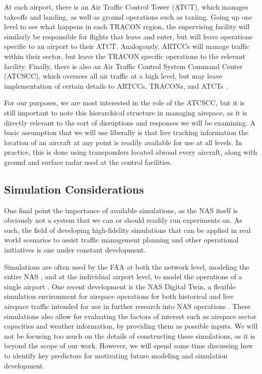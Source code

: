 At each airport, there is an Air Traffic Control Tower (ATCT), which manages takeoffs and landing, as well as ground operations such as taxiing. Going up one level to see what happens in each TRACON region, the supervising facility will similarly be responsible for flights that leave and enter, but will leave operations specific to an airport to their ATCT. Analogously, ARTCCs will manage traffic within their sector, but leave the TRACON specific operations to the relevant facility. Finally, there is also an Air Traffic Control System Command Center (ATCSCC), which oversees all air traffic at a high level, but may leave implementation of certain details to ARTCCs, TRACONs, and ATCTs \cite{faa_tfm_overview_2025}.

For our purposes, we are most interested in the role of the ATCSCC, but it is still important to note this hierarchical structure in managing airspace, as it is directly relevant to the sort of disruptions and responses we will be examining. A basic assumption that we will use liberally is that live tracking information the location of an aircraft at any point is readily available for use at all levels. In practice, this is done using transponders located abroad every aircraft, along with ground and surface radar used at the control facilities. \cite{faa_tfm_prez_2009}


\subsection{Simulation Considerations}

One final point the importance of available simulations, as the NAS itself is obviously not a system that we can or should readily run experiments on. As such, the field of developing high-fidelity simulations that can be applied in real world scenarios to assist traffic management planning and other operational initiatives is one under constant development. 

Simulations are often used by the FAA at both the network level, modeling the entire NAS \cite{faa_sim_2024}, and at the individual airport level, to model the operations of a single airport \cite{faa_lga_2024}. One recent development is the NAS Digital Twin, a flexible simulation environment for airspace operations for both historical and live airspace traffic intended for use in further research into NAS operations \cite{Lauderdale_Windhorst_Coppenbarger_Thipphavong_Erzberger_2024}. These simulations also allow for evaluating the factors of interest such as airspace sector capacities and weather information, by providing them as possible inputs. We will not be focusing too much on the details of constructing these simulations, as it is beyond the scope of our work. However, we will spend some time discussing how to identify key predictors for motivating future modeling and simulation development. 

